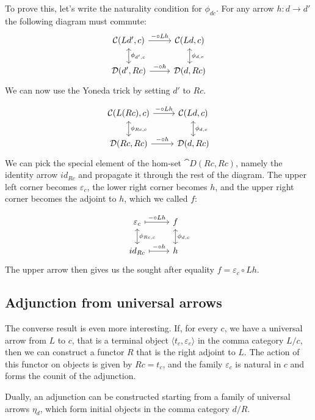 \documentclass[DaoFP]{subfiles}
\begin{document}
To prove this, let's write the naturality condition for $\phi_{d c}$. For any arrow $h \colon d \to d'$ the following diagram must commute:
\[
 \begin{tikzcd}
 \mathcal{C}(L d', c)
 \arrow[d, leftrightarrow, "\phi_{d', c}"]
 \arrow[r, "- \circ L h"]
 &
 \mathcal{C}(L d, c)
  \arrow[d, leftrightarrow, "\phi_{d, c}"]
 \\
 \mathcal{D}(d', R c)
 \arrow[r, "- \circ h"]
& \mathcal{D}(d, R c)
 \end{tikzcd}
\]
We can now use the Yoneda trick by setting $d'$ to $R c$.

\[
 \begin{tikzcd}
 \mathcal{C}(L (R c), c)
 \arrow[d, leftrightarrow, "\phi_{R c, c}"]
 \arrow[r, "- \circ L h"]
 &
 \mathcal{C}(L d, c)
  \arrow[d, leftrightarrow, "\phi_{d, c}"]
 \\
 \mathcal{D}(R c, R c)
 \arrow[r, "- \circ h"]
& \mathcal{D}(d, R c)
 \end{tikzcd}
\]
We can pick the special element of the hom-set $\cat D(R c, R c)$, namely the identity arrow $id_{R c}$ and propagate it through the rest of the diagram. The upper left corner becomes $\varepsilon_c$, the lower right corner becomes $h$, and the upper right corner becomes the adjoint to $h$, which we called $f$:

\[
 \begin{tikzcd}
\varepsilon_c
 \arrow[d, leftrightarrow, "\phi_{R c, c}"]
 \arrow[r, maps to, "- \circ L h"]
 &
f
  \arrow[d, leftrightarrow, "\phi_{d, c}"]
 \\
id_{R c}
 \arrow[r, maps to, "- \circ h"]
& h
 \end{tikzcd}
\]
The upper arrow then gives us the sought after equality $f = \varepsilon_c \circ L h$.

\subsection{Adjunction from universal arrows}

The converse result is even more interesting. If, for every $c$, we have a universal arrow from $L$ to $c$, that is a terminal object $\langle t_c, \varepsilon_c \rangle$ in the comma category $L/c$, then we can construct a functor $R$ that is the right adjoint to $L$. The action of this functor on objects is given by $R c = t_c$, and the family $\varepsilon_c$ is natural in $c$ and forms the counit of the adjunction.

Dually, an adjunction can be constructed starting from a family of universal arrows $\eta_d$, which form initial objects in the comma category $d/R$. 
\end{document}
